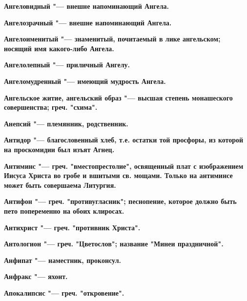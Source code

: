 \bfseries Ангеловидный \normalfont{} "--- внешне напоминающий Ангела. 




\bfseries Ангелозрачный \normalfont{} "--- внешне напоминающий Ангела. 




\bfseries Ангелоименитый \normalfont{} "--- знаменитый, почитаемый в лике ангельском; носящий имя какого-либо Ангела. 




\bfseries Ангелолепный \normalfont{} "--- приличный Ангелу. 




\bfseries Ангеломудренный \normalfont{} "--- имеющий мудрость Ангела. 




\bfseries Ангельское житие, ангельский образ \normalfont{} "--- высшая степень монашеского совершенства; греч. "схима". 




\bfseries Анепсий \normalfont{} "--- племянник, родственник. 




\bfseries Антидор \normalfont{} "--- благословенный хлеб, т.е. остатки той просфоры, из которой на проскомидии был изъят Агнец. 




\bfseries Антиминс \normalfont{} "--- греч. "вместопрестолие", освященный плат с изображением Иисуса Христа во гробе и вшитыми св. мощами. Только на антиминсе может быть совершаема Литургия. 




\bfseries Антифон \normalfont{} "--- греч. "противугласник"; песнопение, которое должно быть пето попеременно на обоих клиросах. 




\bfseries Антихрист \normalfont{} "--- греч. "противник Христа". 




\bfseries Антологион \normalfont{} "--- греч. "Цветослов"; название "Минеи праздничной". 




\bfseries Анфипат \normalfont{} "--- наместник, проконсул. 




\bfseries Анфракс \normalfont{} "--- яхонт. 




\bfseries Апокалипсис \normalfont{} "--- греч. "откровение". 




